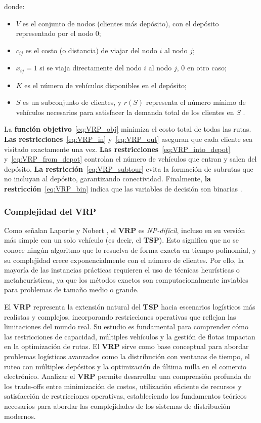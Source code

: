 \documentclass[12pt,titlepage,twoside,openright]{book}
\begin{document}
\noindent donde:
\begin{itemize}
	\item \(V\) es el conjunto de nodos (clientes más depósito), con el depósito representado por el nodo 0;
	\item \(c_{ij}\) es el costo (o distancia) de viajar del nodo \(i\) al nodo \(j\);
	\item \(x_{ij} = 1\) si se viaja directamente del nodo \(i\) al nodo \(j\), 0 en otro caso;
	\item \(K\) es el número de vehículos disponibles en el depósito;
	\item \(S\) es un subconjunto de clientes, y \(r(S)\) representa el número mínimo de vehículos necesarios para satisfacer la demanda total de los clientes en \(S\) \citep{toth2014}.
\end{itemize}

La \textbf{función objetivo}~\eqref{eq:VRP_obj} minimiza el costo total de todas las rutas. \textbf{Las restricciones}~\eqref{eq:VRP_in} y~\eqref{eq:VRP_out} aseguran que cada cliente sea visitado exactamente una vez. \textbf{Las restricciones}~\eqref{eq:VRP_into_depot} y~\eqref{eq:VRP_from_depot} controlan el número de vehículos que entran y salen del depósito. \textbf{La restricción}~\eqref{eq:VRP_subtour} evita la formación de subrutas que no incluyan al depósito, garantizando conectividad. Finalmente, \textbf{la restricción}~\eqref{eq:VRP_bin} indica que las variables de decisión son binarias \citep{toth2014}.


\subsubsection*{Complejidad del VRP}
\label{subsec:complejidad_vrp} 

Como señalan Laporte y Nobert \cite{laporte1987}, el \textbf{VRP} es \textit{NP-difícil}, incluso en su versión más simple con un solo vehículo (es decir, el \textbf{TSP}). Esto significa que no se conoce ningún algoritmo que lo resuelva de forma exacta en tiempo polinomial, y su complejidad crece exponencialmente con el número de clientes. Por ello, la mayoría de las instancias prácticas requieren el uso de técnicas heurísticas o metaheurísticas, ya que los métodos exactos son computacionalmente inviables para problemas de tamaño medio o grande.

El \textbf{VRP} representa la extensión natural del \textbf{TSP} hacia escenarios logísticos más realistas y complejos, incorporando restricciones operativas que reflejan las limitaciones del mundo real. Su estudio es fundamental para comprender cómo las restricciones de capacidad, múltiples vehículos y la gestión de flotas impactan en la optimización de rutas. El \textbf{VRP} sirve como base conceptual para abordar problemas logísticos avanzados como la distribución con ventanas de tiempo, el ruteo con múltiples depósitos y la optimización de última milla en el comercio electrónico. Analizar el \textbf{VRP} permite desarrollar una comprensión profunda de los trade-offs entre minimización de costos, utilización eficiente de recursos y satisfacción de restricciones operativas, estableciendo los fundamentos teóricos necesarios para abordar las complejidades de los sistemas de distribución modernos.
\end{document}
